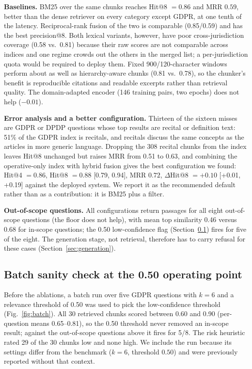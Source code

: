 \documentclass[conference]{IEEEtran}
\newcommand{\ci}[2]{[#1, #2]}
\begin{document}
\textbf{Baselines.} BM25 over the same chunks reaches Hit@8 $=0.86$ and MRR $0.59$, better than the dense retriever on every category except GDPR, at one tenth of the latency. Reciprocal-rank fusion of the two is comparable (0.85/0.59) and has the best precision@8. Both lexical variants, however, have poor cross-jurisdiction coverage (0.58 vs.\ 0.81) because their raw scores are not comparable across indices and one regime crowds out the others in the merged list; a per-jurisdiction quota would be required to deploy them. Fixed 900/120-character windows perform about as well as hierarchy-aware chunks (0.81 vs.\ 0.78), so the chunker's benefit is reproducible citations and readable excerpts rather than retrieval quality. The domain-adapted encoder (146 training pairs, two epochs) does not help ($-0.01$).

\textbf{Error analysis and a better configuration.} Thirteen of the sixteen misses are GDPR or DPDP questions whose top results are recital or definition text: 51\% of the GDPR index is recitals, and recitals discuss the same concepts as the articles in more generic language. Dropping the 308 recital chunks from the index leaves Hit@8 unchanged but raises MRR from 0.51 to 0.63, and combining the operative-only index with hybrid fusion gives the best configuration we found: Hit@4 $=0.86$, Hit@8 $=0.88$ \ci{0.79}{0.94}, MRR $0.72$, $\Delta$Hit@8 $=+0.10$ \ci{+0.01}{+0.19} against the deployed system. We report it as the recommended default rather than as a contribution: it is BM25 plus a filter.

\textbf{Out-of-scope questions.} All configurations return passages for all eight out-of-scope questions (the floor does not help), with mean top similarity 0.46 versus 0.68 for in-scope questions; the 0.50 low-confidence flag (Section~\ref{sec:batch}) fires for five of the eight. The generation stage, not retrieval, therefore has to carry refusal for these cases (Section~\ref{sec:generation}).

\subsection{Batch sanity check at the 0.50 operating point}
\label{sec:batch}
Before the ablations, a batch run over five GDPR questions with $k=6$ and a relevance threshold of 0.50 was used to pick the low-confidence threshold (Fig.~\ref{fig:batch}). All 30 retrieved chunks scored between 0.60 and 0.90 (per-question means 0.65--0.81), so the 0.50 threshold never removed an in-scope result; against the out-of-scope questions above it fires for 5/8. The risk heuristic rated 29 of the 30 chunks low and none high. We include the run because its settings differ from the benchmark ($k=6$, threshold $0.50$) and were previously reported without that context.
\end{document}
